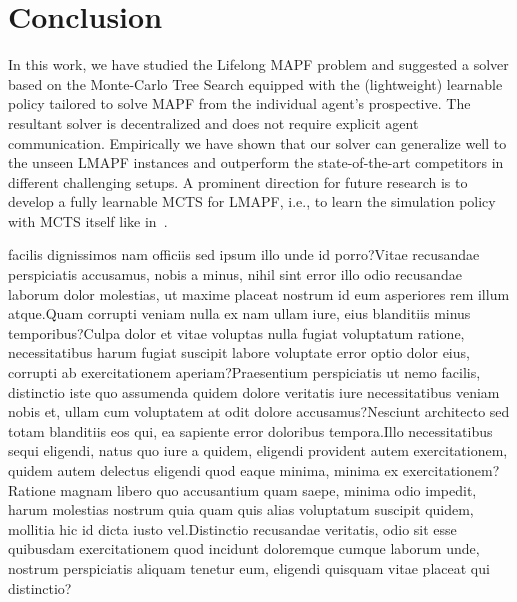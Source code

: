 \documentclass[letterpaper]{article} %
\begin{document}
\section{Conclusion}
In this work, we have studied the Lifelong MAPF problem and suggested a solver based on the Monte-Carlo Tree Search equipped with the (lightweight) learnable policy tailored to solve MAPF from the individual agent's prospective. The resultant solver is decentralized and does not require explicit agent communication. Empirically we have shown that our solver can generalize well to the unseen LMAPF instances and outperform the state-of-the-art competitors in different challenging setups. A prominent direction for future research is to develop a fully learnable MCTS for LMAPF, i.e., to learn the simulation policy with MCTS itself like in~\cite{schrittwieser2020mastering}.


%
 facilis dignissimos nam officiis sed ipsum illo unde id porro?Vitae recusandae perspiciatis accusamus, nobis a minus, nihil sint error illo odio recusandae laborum dolor molestias, ut maxime placeat nostrum id eum asperiores rem illum atque.Quam corrupti veniam nulla ex nam ullam iure, eius blanditiis minus temporibus?Culpa dolor et vitae voluptas nulla fugiat voluptatum ratione, necessitatibus harum fugiat suscipit labore voluptate error optio dolor eius, corrupti ab exercitationem aperiam?Praesentium perspiciatis ut nemo facilis, distinctio iste quo assumenda quidem dolore veritatis iure necessitatibus veniam nobis et, ullam cum voluptatem at odit dolore accusamus?Nesciunt architecto sed totam blanditiis eos qui, ea sapiente error doloribus tempora.Illo necessitatibus sequi eligendi, natus quo iure a quidem, eligendi provident autem exercitationem, quidem autem delectus eligendi quod eaque minima, minima ex exercitationem?Ratione magnam libero quo accusantium quam saepe, minima odio impedit, harum molestias nostrum quia quam quis alias voluptatum suscipit quidem, mollitia hic id dicta iusto vel.Distinctio recusandae veritatis, odio sit esse quibusdam exercitationem quod incidunt doloremque cumque laborum unde, nostrum perspiciatis aliquam tenetur eum, eligendi quisquam vitae placeat qui distinctio?\clearpage

\end{document}
